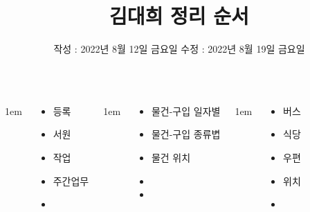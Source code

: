 \documentclass[	20pt, 
							a0paper, 
							landscape,
							margin=0mm, %
							innermargin=10mm,  		%
							blockverticalspace=4mm, %
							colspace=5mm, 
							subcolspace=0mm
							]{tikzposter}
\title{ 김대희 정리 순서 }
\author{ 		작성 : 2022년 8월 12일 금요일 수정 : 2022년 8월 19일 금요일 }
\begin{document}
	\maketitle[
					width=841mm,
					linewidth = 2mm,
					innersep=4mm,
					titletotopverticalspace=2mm, %
					titletoblockverticalspace=2mm, %
					titletextscale =4, 
				]


	\begin{columns}


			{
					\setlength{\leftmargini}{4em}
					\setlength{\labelsep} {1em}
				\begin{LARGE}
					\begin{itemize}
					\item 등록 
					\item 서원
					\item 작업
					\item 주간업무
					\item 
					\end{itemize}
				\end{LARGE}
			} %


			{
					\setlength{\leftmargini}{4em}
					\setlength{\labelsep} {1em}
				\begin{LARGE}
					\begin{itemize}
					\item 물건-구입 일자별 
					\item 물건-구입 종류볍
					\item 물건 위치
					\item
					\item
					\end{itemize}
				\end{LARGE}
			} %


			{
					\setlength{\leftmargini}{4em}
					\setlength{\labelsep} {1em}
				\begin{LARGE}
					\begin{itemize}
					\item 버스
					\item 식당
					\item 우편
					\item 위치
					\item
					\end{itemize}
				\end{LARGE}
			} %



\end{columns}
\end{document}
